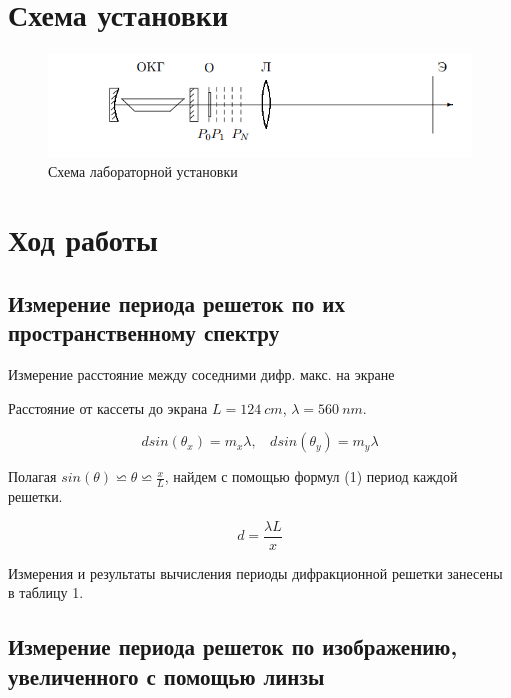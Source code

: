 \documentclass[15pt,a5paper,reqno]{article}
\begin{document}
\section{Схема установки}

\begin{figure}[h!]
    \centering
    \includegraphics[width=15cm]{pics/scheme.png}
    \caption{Схема лабораторной установки}
    \label{fig:vac}
\end{figure}

\section{Ход работы}


\subsection{Измерение периода решеток по их пространственному спектру}


\begin{table}[h!]
	\centering
	
	\caption{Измерение расстояние между соседними дифр. макс. на экране}
	\label{nu1}
\end{table}


Расстояние от кассеты до экрана $L = 124 \: cm$, $\lambda = 560 \: nm$.

\begin{equation}
    dsin(\theta_x) = m_x \lambda, \:\:\:\: d sin(\theta_y) = m_y \lambda     
  \label{first}
\end{equation}

Полагая $sin(\theta) \backsimeq \theta \backsimeq \frac{x}{L}$, найдем с помощью формул (1) период каждой решетки.

\[     d = \frac{\lambda L}{x}        \]

Измерения и результаты вычисления периоды дифракционной решетки занесены в таблицу 1.



\subsection{Измерение периода решеток по изображению, увеличенного с помощью линзы}
\end{document}
